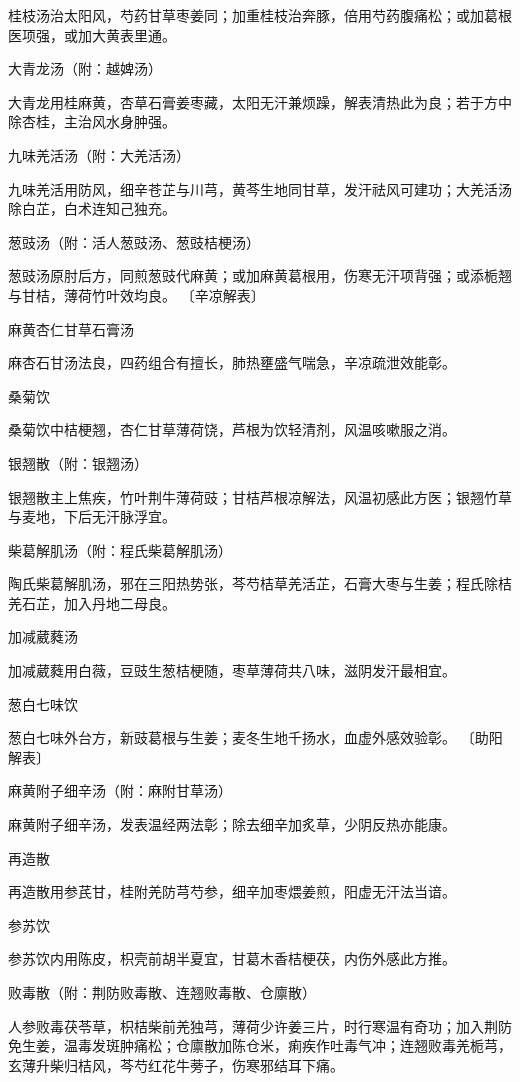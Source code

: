 \documentclass[a4paper,12pt,UTF8,twoside]{ctexbook}
\begin{document}
桂枝汤治太阳风，芍药甘草枣姜同；加重桂枝治奔豚，倍用芍药腹痛松；或加葛根医项强，或加大黄表里通。

大青龙汤（附：越婢汤）

大青龙用桂麻黄，杏草石膏姜枣藏，太阳无汗兼烦躁，解表清热此为良；若于方中除杏桂，主治风水身肿强。

九味羌活汤（附：大羌活汤）

九味羌活用防风，细辛苍芷与川芎，黄芩生地同甘草，发汗祛风可建功；大羌活汤除白芷，白术连知己独充。

葱豉汤（附：活人葱豉汤、葱豉桔梗汤）

葱豉汤原肘后方，同煎葱豉代麻黄；或加麻黄葛根用，伤寒无汗项背强；或添栀翘与甘桔，薄荷竹叶效均良。
〔辛凉解表〕

麻黄杏仁甘草石膏汤

麻杏石甘汤法良，四药组合有擅长，肺热壅盛气喘急，辛凉疏泄效能彰。

桑菊饮

桑菊饮中桔梗翘，杏仁甘草薄荷饶，芦根为饮轻清剂，风温咳嗽服之消。

银翘散（附：银翘汤）

银翘散主上焦疾，竹叶荆牛薄荷豉；甘桔芦根凉解法，风温初感此方医；银翘竹草与麦地，下后无汗脉浮宜。

柴葛解肌汤（附：程氏柴葛解肌汤）

陶氏柴葛解肌汤，邪在三阳热势张，芩芍桔草羌活芷，石膏大枣与生姜；程氏除桔羌石芷，加入丹地二母良。

加减葳蕤汤

加减葳蕤用白薇，豆豉生葱桔梗随，枣草薄荷共八味，滋阴发汗最相宜。

葱白七味饮

葱白七味外台方，新豉葛根与生姜；麦冬生地千扬水，血虚外感效验彰。
〔助阳解表〕

麻黄附子细辛汤（附：麻附甘草汤）

麻黄附子细辛汤，发表温经两法彰；除去细辛加炙草，少阴反热亦能康。

再造散

再造散用参芪甘，桂附羌防芎芍参，细辛加枣煨姜煎，阳虚无汗法当谙。

参苏饮

参苏饮内用陈皮，枳壳前胡半夏宜，甘葛木香桔梗茯，内伤外感此方推。

败毒散（附：荆防败毒散、连翘败毒散、仓廪散）

人参败毒茯苓草，枳桔柴前羌独芎，薄荷少许姜三片，时行寒温有奇功；加入荆防免生姜，温毒发斑肿痛松；仓廪散加陈仓米，痢疾作吐毒气冲；连翘败毒羌栀芎，玄薄升柴归桔风，芩芍红花牛蒡子，伤寒邪结耳下痛。
\end{document}
